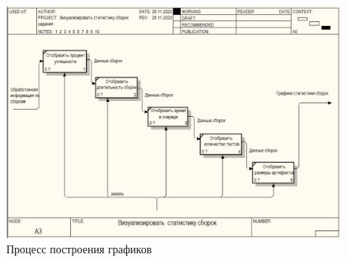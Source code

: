 \begin{figure}[ht!] 
	\center
	\includegraphics [scale=0.7] {my_folder/images//ide3}
	\caption{Процесс построения графиков} 
	\label{fig:spbpu_hydrotower-app-}  
\end{figure}

